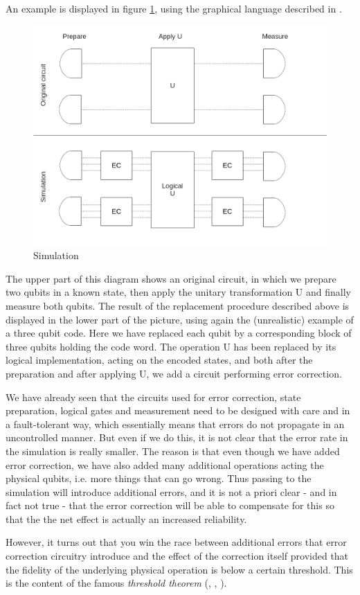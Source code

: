 \documentclass[a4paper, draft]{article}
\theoremstyle{own}
\theoremstyle{remark}
\begin{document}
An example is displayed in figure \ref{fig:Simulation}, using the graphical language described in \cite{G1}. 


\begin{figure}[ht]
\centering
\includegraphics[width=0.7\linewidth]{images/Simulation}
\caption[Simulation]{Simulation}
\label{fig:Simulation}
\end{figure}

The upper part of this diagram shows an original circuit, in which we prepare two qubits in a known state, then apply the unitary transformation U and finally measure both qubits. The result of the replacement procedure described above is displayed in the lower part of the picture, using again the (unrealistic) example of a three qubit code. Here we have replaced each qubit by a corresponding block of three qubits holding the code word. The operation U has been replaced by its logical implementation, acting on the encoded states, and both after the preparation and after applying U, we add a circuit performing error correction.

We have already seen that the circuits used for error correction, state preparation, logical gates and measurement need to be designed with care and in a fault-tolerant way, which essentially means that errors do not propagate in an uncontrolled manner. But even if we do this, it is not clear that the error rate in the simulation is really smaller. The reason is that even though we have added error correction, we have also added many additional operations acting the physical qubits, i.e. more things that can go wrong. Thus passing to the simulation will introduce additional errors, and it is not a priori clear - and in fact not true - that the error correction will be able to compensate for this so that the the net effect is actually an increased reliability. 

However, it turns out that you win the race between additional errors that error correction circuitry introduce and the effect of the correction itself provided that the fidelity of the underlying physical operation is below a certain threshold. This is the content of the famous \emph{threshold theorem} (\cite{AharonovOr}, \cite{KnillLaflammeZurek}, \cite{AliferisGottesmanPreskill}).
\end{document}
